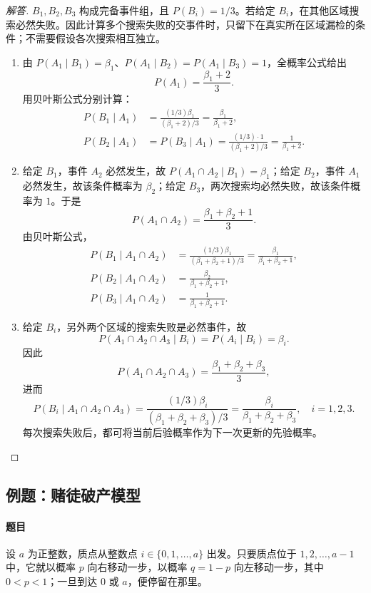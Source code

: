 \begin{proof}[解答]
$B_1,B_2,B_3$ 构成完备事件组，且 $P(B_i)=1/3$。若给定 $B_i$，在其他区域搜索必然失败。因此计算多个搜索失败的交事件时，只留下在真实所在区域漏检的条件；不需要假设各次搜索相互独立。
\begin{enumerate}
\item 由 $P(A_1\mid B_1)=\beta_1$、$P(A_1\mid B_2)=P(A_1\mid B_3)=1$，全概率公式给出
\[P(A_1)=\frac{\beta_1+2}{3}.\]
用贝叶斯公式分别计算：
\begin{align*}
P(B_1\mid A_1)&=\frac{(1/3)\beta_1}{(\beta_1+2)/3}=\frac{\beta_1}{\beta_1+2},\\
P(B_2\mid A_1)&=P(B_3\mid A_1)=\frac{(1/3)\cdot1}{(\beta_1+2)/3}=\frac1{\beta_1+2}.
\end{align*}
\item 给定 $B_1$，事件 $A_2$ 必然发生，故 $P(A_1\cap A_2\mid B_1)=\beta_1$；给定 $B_2$，事件 $A_1$ 必然发生，故该条件概率为 $\beta_2$；给定 $B_3$，两次搜索均必然失败，故该条件概率为 $1$。于是
\[P(A_1\cap A_2)=\frac{\beta_1+\beta_2+1}{3}.\]
由贝叶斯公式，
\begin{align*}
P(B_1\mid A_1\cap A_2)&=\frac{(1/3)\beta_1}{(\beta_1+\beta_2+1)/3}=\frac{\beta_1}{\beta_1+\beta_2+1},\\
P(B_2\mid A_1\cap A_2)&=\frac{\beta_2}{\beta_1+\beta_2+1},\\
P(B_3\mid A_1\cap A_2)&=\frac1{\beta_1+\beta_2+1}.
\end{align*}
\item 给定 $B_i$，另外两个区域的搜索失败是必然事件，故
\[P(A_1\cap A_2\cap A_3\mid B_i)=P(A_i\mid B_i)=\beta_i.\]
因此
\[P(A_1\cap A_2\cap A_3)=\frac{\beta_1+\beta_2+\beta_3}{3},\]
进而
\[P(B_i\mid A_1\cap A_2\cap A_3)=\frac{(1/3)\beta_i}{(\beta_1+\beta_2+\beta_3)/3}=\frac{\beta_i}{\beta_1+\beta_2+\beta_3},\quad i=1,2,3.\]
每次搜索失败后，都可将当前后验概率作为下一次更新的先验概率。
\end{enumerate}
\end{proof}

\subsection{例题：赌徒破产模型}\label{note:c1:e23}
\paragraph{题目}
设 $a$ 为正整数，质点从整数点 $i\in\{0,1,\ldots,a\}$ 出发。只要质点位于 $1,2,\ldots,a-1$ 中，它就以概率 $p$ 向右移动一步，以概率 $q=1-p$ 向左移动一步，其中 $0<p<1$；一旦到达 $0$ 或 $a$，便停留在那里。

